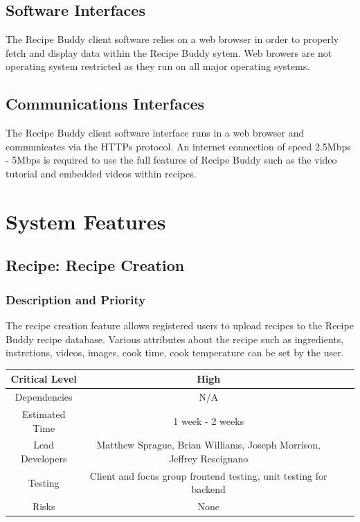 \documentclass{scrreprt}
\begin{document}
\section{Software Interfaces}
The \gls{Recipe Buddy} client software relies on a web browser in order to properly fetch and display data within the \gls{Recipe Buddy} sytem. Web browers are not operating system restricted as they run on all major operating systems.

\section{Communications Interfaces}
The \gls{Recipe Buddy} client software interface runs in a web browser and communicates via the \gls{HTTPs} protocol. An internet connection of speed 2.5Mbps - 5Mbps is required to use the full features of \gls{Recipe Buddy} such as the video tutorial and embedded videos within recipes.

\chapter{System Features}

\section{Recipe: Recipe Creation}

\subsection{Description and Priority}

The recipe creation feature allows registered users to upload recipes to the \gls{Recipe Buddy} recipe database. Various attributes about the recipe such as ingredients, instrctions, videos, images, cook time, cook temperature can be set by the user.

\begin{center}
    \begin{tabular}{| c | c | c | c |}
        \hline
        Critical Level  & High                                                                 \\
        \hline
        Dependencies    & N/A                                                                  \\
        \hline
        Estimated Time  & 1 week - 2 weeks                                                     \\
        \hline
        Lead Developers & Matthew Sprague, Brian Williams, Joseph Morrison, Jeffrey Rescignano \\
        \hline
        Testing         & Client and focus group \gls{frontend} testing,
                          \gls{unit testing} for \gls{backend}                                 \\
        \hline
        Risks           & None                                                                 \\
        \hline
    \end{tabular}
\end{center}
\end{document}
